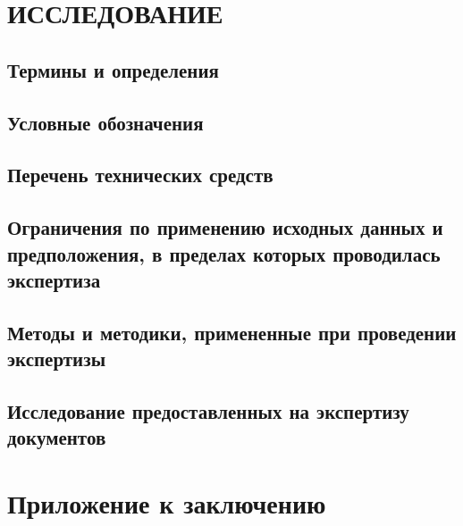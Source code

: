 \section{ИССЛЕДОВАНИЕ}

\subsection{Термины и определения}
%

\subsection{Условные обозначения}
%

\subsection{Перечень технических средств}
%

\subsection{Ограничения по применению исходных данных и предположения, в пределах которых проводилась экспертиза}
%


\subsection{Методы и методики, примененные при проведении экспертизы}
%


\subsection{Исследование предоставленных на экспертизу документов}
%









\appendix
\section{Приложение к заключению} 
%










 
